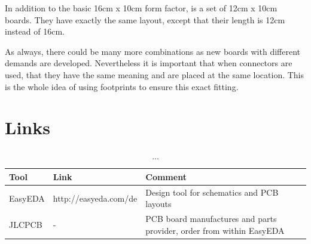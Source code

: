 In addition to the basic 16cm x 10cm form factor, is a set of 12cm x 10cm boards. They have exactly the same layout, except that their length is 12cm instead of 16cm. 

As always, there could be many more combinations as new boards with different demands are developed. Nevertheless it is important that when connectors are used, that they have the same meaning and are placed at the same location. This is the whole idea of using footprints to ensure this exact fitting.

\section{Links}

\begin{table}[!ht]
    \begin{center}
        \caption{...}
        \begin{tabular}{|l|l|p{}|}
            \toprule
            \textbf{Tool} & \textbf{Link} & \textbf{Comment} \\
            \midrule
            EasyEDA & http://easyeda.com/de & Design tool for schematics and PCB layouts \\
            \midrule
            JLCPCB & - & PCB board manufactures and parts provider, order from within EasyEDA \\
            \bottomrule
        \end{tabular}
    \end{center}
\end{table}
